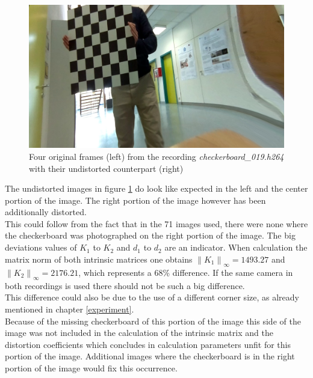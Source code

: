 \begin{figure}[H]
\begin{minipage}[t]{0.24\textwidth}
     \end{minipage}%
     \begin{minipage}[t]{0.24\textwidth}
        \centering
        \includegraphics[width=.95\textwidth]{image/3/rec_2/737_undist.png}
     \end{minipage}
     
     \caption{Four original frames (left) from the recording \textit{checkerboard\_019.h264} with their undistorted counterpart (right)}
    \label{fig:rec_019}
\end{figure}

The undistorted images in figure \ref{fig:rec_019} do look like expected in the left and the center portion of the image. The right portion of the image however has been additionally distorted. \\

This could follow from the fact that in the 71 images used, there were none where the checkerboard was photographed on the right portion of the image. The big deviations values of $K_1$ to $K_2$ and $d_1$ to $d_2$ are an indicator. When calculation the matrix norm of both intrinsic matrices one obtains $\left \| K_1 \right \|_{\infty} = 1493.27$ and $\left \| K_2 \right \|_{\infty} = 2176.21$, which represents a 68\% difference. If the same camera in both recordings is used there should not be such a big difference.\\

This difference could also be due to the use of a different corner size, as already mentioned in chapter \ref{experiment}.\\

Because of the missing checkerboard of this portion of the image this side of the image was not included in the calculation of the intrinsic matrix and the distortion coefficients which concludes in calculation parameters unfit for this portion of the image. Additional images where the checkerboard is in the right portion of the image would fix this occurrence.